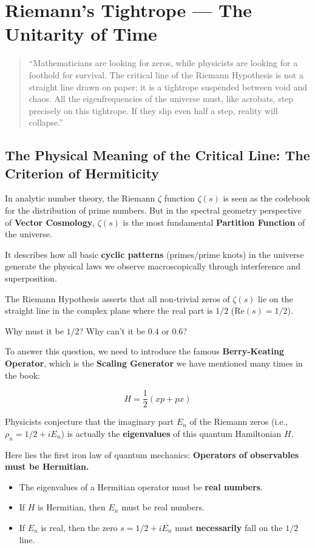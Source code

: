 \documentclass[11pt,a4paper,twoside]{book}
\begin{document}
\section{Riemann's Tightrope — The Unitarity of Time}

\begin{quote}
``Mathematicians are looking for zeros, while physicists are looking for a foothold for survival. The critical line of the Riemann Hypothesis is not a straight line drawn on paper; it is a tightrope suspended between void and chaos. All the eigenfrequencies of the universe must, like acrobats, step precisely on this tightrope. If they slip even half a step, reality will collapse.''
\end{quote}

\subsection{The Physical Meaning of the Critical Line: The Criterion of Hermiticity}

In analytic number theory, the Riemann $\zeta$ function $\zeta(s)$ is seen as the codebook for the distribution of prime numbers. But in the spectral geometry perspective of \textbf{Vector Cosmology}, $\zeta(s)$ is the most fundamental \textbf{Partition Function} of the universe.

It describes how all basic \textbf{cyclic patterns} (primes/prime knots) in the universe generate the physical laws we observe macroscopically through interference and superposition.

The Riemann Hypothesis asserts that all non-trivial zeros of $\zeta(s)$ lie on the straight line in the complex plane where the real part is \textbf{$1/2$} ($\text{Re}(s) = 1/2$).

Why must it be \textbf{$1/2$}? Why can't it be $0.4$ or $0.6$?

To answer this question, we need to introduce the famous \textbf{Berry-Keating Operator}, which is the \textbf{Scaling Generator} we have mentioned many times in the book:

$$H = \frac{1}{2}(xp + px)$$

Physicists conjecture that the imaginary part $E_n$ of the Riemann zeros (i.e., $\rho_n = 1/2 + iE_n$) is actually the \textbf{eigenvalues} of this quantum Hamiltonian $H$.

Here lies the first iron law of quantum mechanics: \textbf{Operators of observables must be Hermitian.}

\begin{itemize}
\item The eigenvalues of a Hermitian operator must be \textbf{real numbers}.

\item If $H$ is Hermitian, then $E_n$ must be real numbers.

\item If $E_n$ is real, then the zero $s = 1/2 + iE_n$ must \textbf{necessarily} fall on the $1/2$ line.
\end{itemize}
\end{document}
